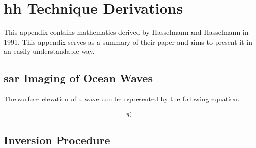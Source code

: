 \appendix
\chapter{\acs{hh} Technique Derivations}
\label{ap:hh}


This appendix contains mathematics derived by Hasselmann and Hasselmann \cite{Hasselmann1991} in 1991. This appendix serves as a summary of their paper and aims to present it in an easily understandable way.

\section{\acs{sar} Imaging of Ocean Waves} \label{ap:hh.sarImaging}

The surface elevation of a wave can be represented by the following equation.

\begin{equation}
    \eta(
\end{equation}


\section{Inversion Procedure} \label{ap:hh.inversion}
